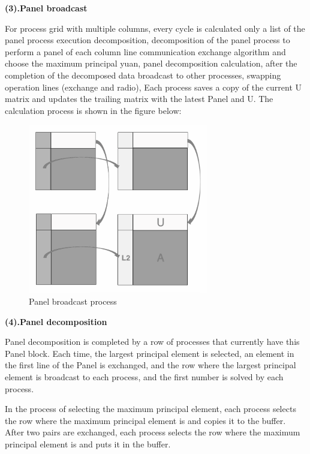 \documentclass[a4paper,12pt]{article}
\begin{document}
\textbf{(3).Panel broadcast}

For process grid with multiple columns, every cycle is calculated only a list of the panel process execution decomposition, decomposition of the panel process to perform a panel of each column line communication exchange algorithm and choose the maximum principal yuan, panel decomposition calculation, after the completion of the decomposed data broadcast to other processes, swapping operation lines (exchange and radio), Each process saves a copy of the current U matrix and updates the trailing matrix with the latest Panel and U. The calculation process is shown in the figure below:

\begin{figure}[H]
    \centering
    \includegraphics[width=0.7\textwidth]{Panel_broadcast_process.png}
    \caption{Panel broadcast process}
    \label{fig:panel_broadcast}
\end{figure}

\textbf{(4).Panel decomposition}

Panel decomposition is completed by a row of processes that currently have this Panel block. Each time, the largest principal element is selected, an element in the first line of the Panel is exchanged, and the row where the largest principal element is broadcast to each process, and the first number is solved by each process.

In the process of selecting the maximum principal element, each process selects the row where the maximum principal element is and copies it to the buffer. After two pairs are exchanged, each process selects the row where the maximum principal element is and puts it in the buffer.
\end{document}
